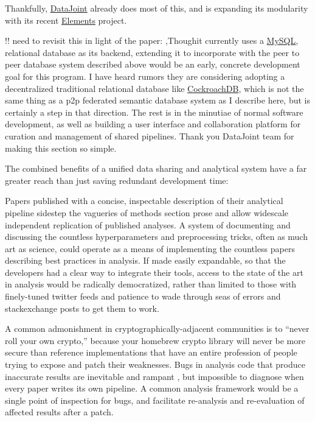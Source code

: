 \documentclass{article}
\begin{document}
Thankfully, \href{https://datajoint.io/}{DataJoint} already does most of
this, and is expanding its modularity with its recent
\href{https://github.com/datajoint/datajoint-elements}{Elements}
project.

!! need to revisit this in light of the paper: \cite{yatsenkoDataJointElementsData2021},Thoughit currently uses a
\href{https://docs.datajoint.io/python/admin/1-hosting.html}{MySQL},
relational database as its backend, extending it to incorporate with the
peer to peer database system described above would be an early, concrete
development goal for this program. I have heard rumors they are
considering adopting a decentralized traditional relational database
like \href{https://www.cockroachlabs.com/product/}{CockroachDB}, which
is not the same thing as a p2p federated semantic database system as I
describe here, but is certainly a step in that direction. The rest is in
the minutiae of normal software development, as well as building a user
interface and collaboration platform for curation and management of
shared pipelines. Thank you DataJoint team for making this section so
simple.

The combined benefits of a unified data sharing and analytical system
have a far greater reach than just saving redundant development time:

Papers published with a concise, inspectable description of their
analytical pipeline sidestep the vagueries of methods section prose and
allow widescale independent replication of published analyses. A system
of documenting and discussing the countless hyperparameters and
preprocessing tricks, often as much art as science, could operate as a
means of implementing the countless papers describing best practices in
analysis. If made easily expandable, so that the developers had a clear
way to integrate their tools, access to the state of the art in analysis
would be radically democratized, rather than limited to those with
finely-tuned twitter feeds and patience to wade through seas of errors
and stackexchange posts to get them to work.

A common admonishment in cryptographically-adjacent communities is to
``never roll your own crypto,'' because your homebrew crypto library
will never be more secure than reference implementations that have an
entire profession of people trying to expose and patch their weaknesses.
Bugs in analysis code that produce inaccurate results are inevitable and
rampant \cite{millerScientistNightmareSoftware2006,
soergelRampantSoftwareErrors2015, eklundClusterFailureWhy2016a,
bhandarineupaneCharacterizationLeptazolinesPolar2019}, but
impossible to diagnose when every paper writes its own pipeline. A
common analysis framework would be a single point of inspection for
bugs, and facilitate re-analysis and re-evaluation of affected results
after a patch.
\end{document}
